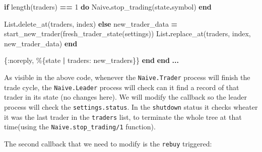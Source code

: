 \documentclass[
  oneside]{book}
\newenvironment{Shaded}{\begin{snugshade}}{\end{snugshade}}
\newcommand{\ConstantTok}[1]{\textcolor[rgb]{0.00,0.00,0.00}{#1}}
\newcommand{\ControlFlowTok}[1]{\textcolor[rgb]{0.13,0.29,0.53}{\textbf{#1}}}
\newcommand{\DecValTok}[1]{\textcolor[rgb]{0.00,0.00,0.81}{#1}}
\newcommand{\KeywordTok}[1]{\textcolor[rgb]{0.13,0.29,0.53}{\textbf{#1}}}
\newcommand{\NormalTok}[1]{#1}
\newcommand{\OperatorTok}[1]{\textcolor[rgb]{0.81,0.36,0.00}{\textbf{#1}}}
\newcommand{\VariableTok}[1]{\textcolor[rgb]{0.00,0.00,0.00}{#1}}
\begin{document}
\begin{Shaded}
\begin{Highlighting}[]
            \ControlFlowTok{if}\NormalTok{ length(traders) }\OperatorTok{==} \DecValTok{1} \KeywordTok{do}
              \ConstantTok{Naive}\OperatorTok{.}\NormalTok{stop\_trading(state}\OperatorTok{.}\NormalTok{symbol)}
            \KeywordTok{end}
            
            \ConstantTok{List}\OperatorTok{.}\NormalTok{delete\_at(traders, index)}
          \ControlFlowTok{else}
\NormalTok{            new\_trader\_data }\OperatorTok{=}\NormalTok{ start\_new\_trader(fresh\_trader\_state(settings))}
            \ConstantTok{List}\OperatorTok{.}\NormalTok{replace\_at(traders, index, new\_trader\_data)}
          \KeywordTok{end}

\NormalTok{        \{}\VariableTok{:noreply}\NormalTok{, \%\{state }\OperatorTok{|} \VariableTok{traders:}\NormalTok{ new\_traders\}\}}
    \KeywordTok{end}
  \KeywordTok{end}
  \OperatorTok{...}
\end{Highlighting}
\end{Shaded}

As visible in the above code, whenever the \texttt{Naive.Trader} process will finish the trade cycle, the \texttt{Naive.Leader} process will check can it find a record of that trader in its state (no changes here). We will modify the callback so the leader process will check the \texttt{settings.status}. In the \texttt{shutdown} status it checks wheater it was the last trader in the \texttt{traders} list, to terminate the whole tree at that time(using the \texttt{Naive.stop\_trading/1} function).

The second callback that we need to modify is the \texttt{rebuy} triggered:
\end{document}
